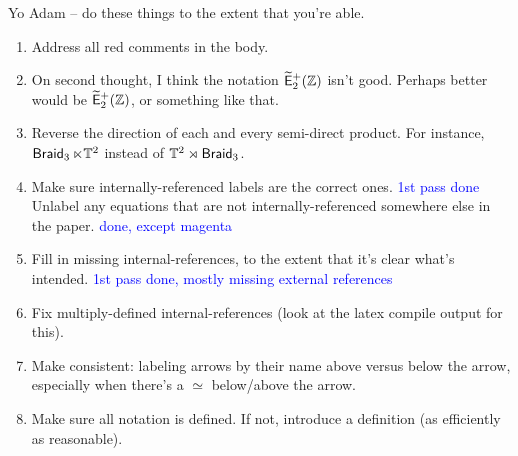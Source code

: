 \documentclass{amsart}
\theoremstyle{definition}
\theoremstyle{remark}
\newcommand{\w}{\widetilde}
\def\sE{\mathsf E}\def\sF{\mathsf F}\def\sG{\mathsf G}\def\sH{\mathsf H}
\DeclareMathOperator{\Braid}{{\sf Braid}_3}
\DeclareMathOperator{\Ebraid}{\w{\sf E}_{2}^{+}(\ZZ)}
\begin{document}
{\color{red}




Yo Adam -- do these things to the extent that you're able.
\begin{enumerate}

%

\item
Address all red comments in the body.

\item
On second thought, I think the notation $\Ebraid$ isn't good.
Perhaps better would be $\w{\sE}^+_2(\ZZ)$, or something like that.

\item
Reverse the direction of each and every semi-direct product.
For instance, $\Braid \ltimes \TT^2$ instead of $\TT^2 \rtimes \Braid$.

%

\item
Make sure internally-referenced labels are the correct ones. \textcolor{blue}{1st pass done}
Unlabel any equations that are not internally-referenced somewhere else in the paper. \textcolor{blue}{done, except magenta}

\item
Fill in missing internal-references, to the extent that it's clear what's intended. \textcolor{blue}{1st pass done, mostly missing external references}

\item
Fix multiply-defined internal-references (look at the latex compile output for this).

\item
Make consistent: labeling arrows by their name above versus below the arrow, especially when there's a $\simeq$ below/above the arrow. 


\item
Make sure all notation is defined.
If not, introduce a definition (as efficiently as reasonable).




\end{enumerate}



}
\end{document}
